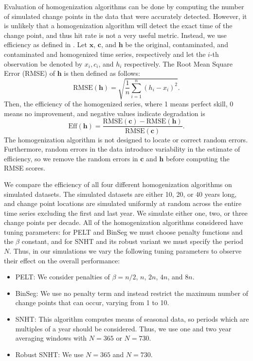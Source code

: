 \documentclass[12pt]{article}
\begin{document}
\begin{doublespacing}
Evaluation of homogenization algorithms can be done by computing the number of simulated change points in the data that were accurately detected.  However, it is unlikely that a homogenization algorithm will detect the exact time of the change point, and thus hit rate is not a very useful metric.  Instead, we use efficiency as defined in \cite{domonkos13}.  Let $\mathbf{x}$, $\mathbf{c}$, and $\mathbf{h}$ be the original, contaminated, and contaminated and homogenized time series, respectively and let the $i$-th observation be denoted by $x_i, c_i$, and $h_i$ respectively.  The Root Mean Square Error (RMSE) of $\mathbf{h}$ is then defined as follows:
\begin{equation*}
	\mbox{RMSE}(\mathbf{h}) = \sqrt{\frac{1}{n} \sum_{i=1}^n (h_i-x_i)^2}.
\end{equation*}
Then, the efficiency of the homogenized series, where 1 means perfect skill, 0 means no improvement, and negative values indicate degradation is
\begin{equation*}
	\mbox{Eff}(\mathbf{h}) = \frac{\mbox{RMSE}(\mathbf{c})-\mbox{RMSE}(\mathbf{h})}{\mbox{RMSE}(\mathbf{c})}.
\end{equation*}
The homogenization algorithm is not designed to locate or correct random errors.  Furthermore, random errors in the data introduce variability in the estimate of efficiency, so we remove the random errors in $\mathbf{c}$ and $\mathbf{h}$ before computing the RMSE scores.  

We compare the efficiency of all four different homogenization algorithms on simulated datasets.  The simulated datasets are  either 10, 20, or 40 years long, and change point locations are simulated uniformly at random across the entire time series excluding the first and last year.  We simulate either one, two, or three change points per decade.  All of the homogenization algorithms considered have tuning parameters: for PELT and BinSeg we must choose penalty functions and the $\beta$ constant, and for SNHT and its robust variant we must specify the period $N$.  Thus, in our simulations we vary the following tuning parameters to observe their effect on the overall performance:

\begin{itemize}
	\item PELT: We consider penalties of $\beta=n/2$, $n$, $2n$, $4n$, and  $8n$.
	\item BinSeg: We use no penalty term and instead restrict the maximum number of change points that can occur, varying from 1 to 10.
	\item SNHT: This algorithm computes means of seasonal data, so periods which are multiples of a year should be considered.  Thus, we use one and two year averaging windows with $N=365$ or $N=730$.
	\item Robust SNHT: We  use $N=365$ and $N= 730$.
\end{itemize}


\end{doublespacing}
\end{document}
